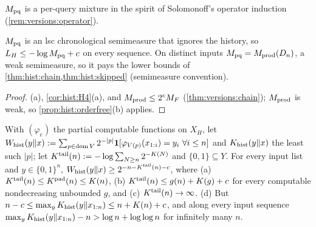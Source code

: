 $M_{\mathrm{pq}}$ is a per-query mixture in the spirit of Solomonoff's operator induction (\cref{rem:versions:operator}).

\begin{proposition}\label{prop:hist:operator}
$M_{\mathrm{pq}}$ is an lsc chronological semimeasure that ignores the history, so $L_{H}\le-\log M_{\mathrm{pq}}+c$ on every sequence. On distinct inputs $M_{\mathrm{pq}}=M_{\mathrm{prod}}(D_n)$, a weak semimeasure, so it pays the lower bounds of \cref{thm:hist:chain,thm:hist:skipped} (semimeasure convention).
\end{proposition}

\begin{proof}
(a), \cref{cor:hist:H4}(a), and $M_{\mathrm{prod}}\le2^cM_{F}$ (\cref{thm:versions:chain}); $M_{\mathrm{prod}}$ is weak, so \cref{prop:hist:orderfree}(b) applies.
\end{proof}

\begin{proposition}\label{prop:hist:programs}
With $(\varphi_e)$ the partial computable functions on $X_H$, let $W_{\mathrm{hist}}(y\Vert x):=\sum_{p\in\operatorname{dom} V}2^{-|p|}\mathbf{1}[\varphi_{V(p)}(x_{1:i})=y_i\ \forall i\le n]$ and $K_{\mathrm{hist}}(y\Vert x)$ the least such $|p|$; let $K^{\mathrm{tail}}(n):=-\log\sum_{N\ge n}2^{-K(N)}$ and $\{0,1\}\subseteq Y$. For every input list and $y\in\{0,1\}^n$, $W_{\mathrm{hist}}(y\Vert x)\ge2^{-n-K^{\mathrm{tail}}(n)-c}$, where (a) $K^{\mathrm{tail}}(n)\le K^{\mathrm{pad}}(n)\le K(n)$, (b) $K^{\mathrm{tail}}(n)\le g(n)+K(g)+c$ for every computable nondecreasing unbounded $g$, and (c) $K^{\mathrm{tail}}(n)\to\infty$. (d) But $n-c\le\max_yK_{\mathrm{hist}}(y\Vert x_{1:n})\le n+K(n)+c$, and along every input sequence $\max_yK_{\mathrm{hist}}(y\Vert x_{1:n})-n>\log n+\log\log n$ for infinitely many $n$.
\end{proposition}

